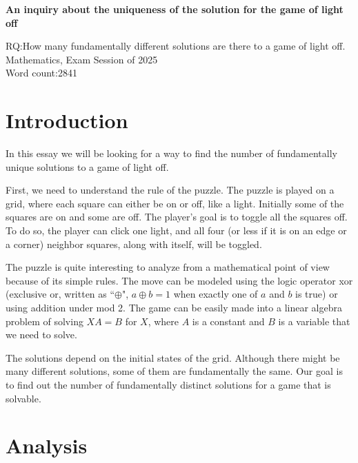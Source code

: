 \documentclass[a4paper, 12pt]{article}
\begin{document}
\begin{titlepage}
\begin{center}
\vspace*{4cm}
{\huge\textbf{An inquiry about the uniqueness of the solution for the game of light off}}
\end{center}
\vspace{1cm}
\begin{flushright}
RQ:How many fundamentally different solutions are there to a game of light off.\\
Mathematics, Exam Session of 2025\\
Word count:2841\\
\end{flushright}
\end{titlepage}

\tableofcontents
\clearpage

\section{Introduction}
In this essay we will be looking for a way to find the number of fundamentally unique solutions to a game of light off.

First, we need to understand the rule of the puzzle. The puzzle is played on a grid, where each square can either be on or off, like a light. Initially some of the squares are on and some are off. The player’s goal is to toggle all the squares off. To do so, the player can click one light, and all four (or less if it is on an edge or a corner) neighbor squares, along with itself, will be toggled.

The puzzle is quite interesting to analyze from a mathematical point of view because of its simple rules. The move can be modeled using the logic operator xor (exclusive or, written as ``$\oplus$", $a \oplus b =1$ when exactly one of $a$ and $b$ is true) or using addition under mod 2. The game can be easily made into a linear algebra problem of solving $XA = B$ for $X$, where $A$ is a constant and $B$ is a variable that we need to solve. 

The solutions depend on the initial states of the grid. Although there might be many different solutions, some of them are fundamentally the same. Our goal is to find out the number of fundamentally distinct solutions for a game that is solvable.

\clearpage
\section{Analysis}
\end{document}
